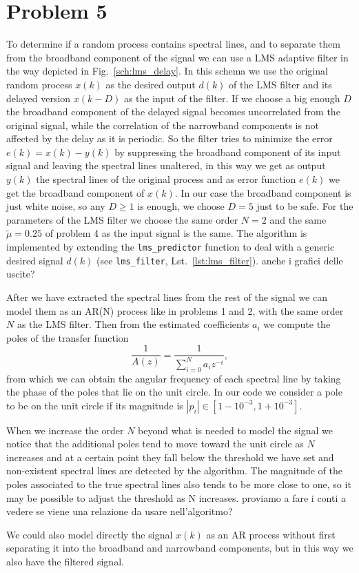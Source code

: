 \documentclass{article}
\newcommand{\inlinecode}[1]{\lstinline[basicstyle=\ttfamily,
    keywordstyle={}]{#1}}
\begin{document}
\section*{Problem 5}
To determine if a random process contains spectral lines, and to
separate them from the broadband component of the signal we can use a
LMS adaptive filter in the way depicted in
Fig.~\ref{sch:lms_delay}. In this schema we use the original random
process $x(k)$ as the desired output $d(k)$ of the LMS filter and its
delayed version $x(k - D)$ as the input of the filter. If we choose a
big enough $D$ the broadband component of the delayed signal becomes
uncorrelated from the original signal, while the correlation of the
narrowband components is not affected by the delay as it is periodic.
So the filter tries to minimize the error $e(k) = x(k) - y(k)$ by
suppressing the broadband component of its input signal and leaving
the spectral lines unaltered, in this way we get as output $y(k)$ the
spectral lines of the original process and as error function $e(k)$ we
get the broadband component of $x(k)$.  In our case the broadband
component is just white noise, so any $D \geq 1$ is enough, we choose
$D=5$ {\color{red} just to be safe}. For the parameters of the LMS
filter we choose the same order $N=2$ and the same $\tilde{\mu} =
0.25$ of problem 4 as the {\color{red} input signal is the same}. The
algorithm is implemented by extending the \inlinecode{lms_predictor}
function to deal with a generic desired signal $d(k)$ (see
\inlinecode{lms_filter}, Lst.~\ref{lst:lms_filter}).{\color{red} anche
  i grafici delle uscite?}

After we have extracted the spectral lines from the rest of the signal
we can model them as an AR(N) process like in problems 1 and 2, with
the same order $N$ as the LMS filter. Then from the estimated
coefficients $a_i$ we compute the poles of the transfer function
\[ \frac{1}{A(z)} = \frac{1}{\sum_{i=0}^{N}a_iz^{-i}} , \]
from which we can obtain the angular frequency of each spectral line
by taking the phase of the poles that lie on the unit circle.  In our
code we consider a pole to be on the unit circle if its magnitude is
$|p_i| \in [1-10^{-3},1+10^{-3}]$.

When we increase the order $N$ beyond what is needed to model the
signal we notice that the additional poles tend to move toward the
unit circle as $N$ increases and at a certain point they fall below
the threshold we have set and non-existent spectral lines are detected
by the algorithm. The magnitude of the poles associated to the true
spectral lines also tends to be more close to one, so it may be
possible to adjust the threshold as N increases. {\color{red} proviamo a fare i conti a vedere se viene una relazione da usare nell'algoritmo?}

We could also model directly the signal $x(k)$ as an AR process
without first separating it into the broadband and narrowband
components, but in this way we also have the filtered signal.
\end{document}

